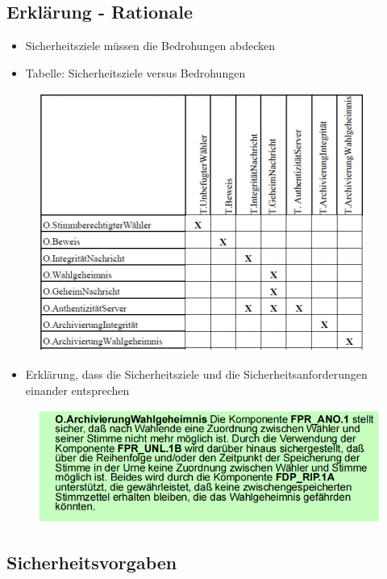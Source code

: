 \documentclass[openany]{book}
\begin{document}
\subsection{Erklärung - Rationale}

\begin{itemize}
    \item Sicherheitsziele müssen die Bedrohungen abdecken
    \item Tabelle: Sicherheitsziele versus Bedrohungen
\end{itemize}

\begin{figure}[h!]
    \centering
    \includegraphics[width=0.65\linewidth]{Pics/Rationals.PNG}
\end{figure}

\begin{itemize}
    \item Erklärung, dass die Sicherheitsziele und die Sicherheitsanforderungen einander entsprechen
\end{itemize}

\begin{figure}[h!]
    \centering
    \includegraphics[width=0.85\linewidth]{Pics/Rationals2.PNG}
\end{figure}

\subsection{Sicherheitsvorgaben}
\end{document}
